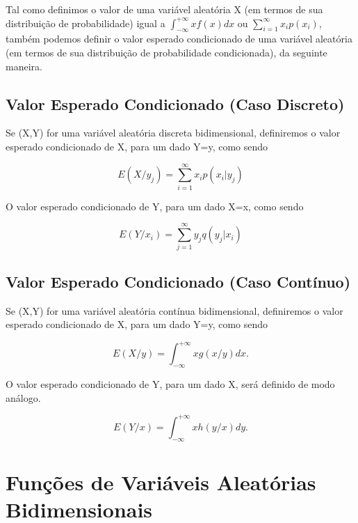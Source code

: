 \documentclass[a4paper,12pt]{report}
\begin{document}
{Tal como definimos o valor de uma variável aleatória X (em termos
de sua distribuição de probabilidade) igual a
$\int^{+\infty}_{-\infty}xf(x)dx$ ou
$\sum_{i=1}^{\infty}x_{i}p(x_{i})$, também podemos definir o valor
esperado condicionado de uma variável aleatória (em termos de sua
distribuição de probabilidade condicionada), da seguinte
maneira.\vskip0.3cm



\subsection{Valor Esperado Condicionado (Caso Discreto)}

Se (X,Y) for uma variável aleatória discreta bidimensional,
definiremos o valor esperado condicionado de X, para um dado Y=y,
como sendo

\begin{equation}\label{}
    E(X/y_{j})= \sum_{i=1}^{\infty}x_{i}p(x_{i}|y_{j})
\end{equation}

O valor esperado condicionado de Y, para um dado X=x, como sendo

\begin{equation}\label{}
    E(Y/x_{i})= \sum_{j=1}^{\infty}y_{j}q(y_{j}|x_{i})
\end{equation}




\subsection{Valor Esperado Condicionado (Caso Contínuo)}

Se (X,Y) for uma variável aleatória contínua bidimensional,
definiremos o valor esperado condicionado de X, para um dado Y=y,
como sendo

\begin{equation}\label{}
    E(X/y)=\int_{-\infty}^{+\infty}xg(x/y)dx.
\end{equation}

O valor esperado condicionado de Y, para um dado X, será definido
de modo análogo.


\begin{equation}\label{}
    E(Y/x)=\int_{-\infty}^{+\infty}x h(y/x)dy.
\end{equation}


\section{Funções de Variáveis Aleatórias Bidimensionais}

}
\end{document}

